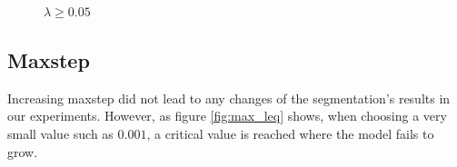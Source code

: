 \begin{figure}[!hbt]
\centering   
{}
\caption{$\lambda \geq 0.05$}
\label{fig:lambda_geq}
\end{figure}

\subsection{Maxstep}

Increasing maxstep did not lead to any changes of the segmentation's results in our experiments. However, as figure \ref{fig:max_leq} shows, when choosing a very small value such as $0.001$, a critical value is reached where the model fails to grow.

